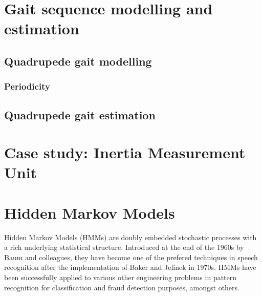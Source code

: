 \section{Gait sequence modelling and estimation}
\subsection{Quadrupede gait modelling}
\subsubsection{Periodicity}
\subsection{Quadrupede gait estimation}
\section{Case study: Inertia Measurement Unit}
\section{Hidden Markov Models}
Hidden Markov Models (HMMs) are doubly embedded stochastic processes with a rich underlying statistical structure. Introduced at the end of the 1960s by Baum and colleagues, they have become one of the prefered techniques in speech recognition after the implementation of Baker and Jelinek in 1970s. HMMs have been successfully applied to various other engineering problems in pattern recognition for classification and fraud detection purposes, amongst others.

